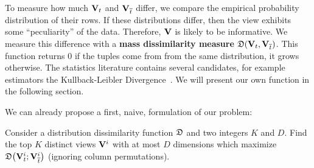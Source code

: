 To measure how much $\mathbf{V}_t$ and ${\mathbf{V}}_{\overline{t}}$ differ, we compare
the empirical probability distribution of their rows. If these distributions
differ, then the view exhibits some ``peculiarity'' of the data.  Therefore,
$\mathbf{V}$ is likely to be informative. We measure this difference with a
\textbf{mass dissimilarity measure} $\mathfrak{D}(\mathbf{V}_t, \mathbf{V}_{\overline{t}})$.  This
function returns 0 if the tuples come from from the same distribution, it grows
otherwise. The statistics literature contains several candidates, for example
estimators the Kullback-Leibler Divergence~\cite{wasserman2013all}. We will
present our own function in the following section.

We can already propose a first, naive, formulation of our problem:
\begin{problem}
    Consider a distribution dissimilarity function $\mathfrak{D}$ and two integers
    $K$ and $D$. Find the top $K$ distinct views $\mathbf{V}^i$ with at most $D$
    dimensions which maximize $ \mathfrak{D}\big( \mathbf{V}^i_t ;
    \mathbf{V}^i_{\overline{t}} \big)$ (ignoring column permutations).
\end{problem}

